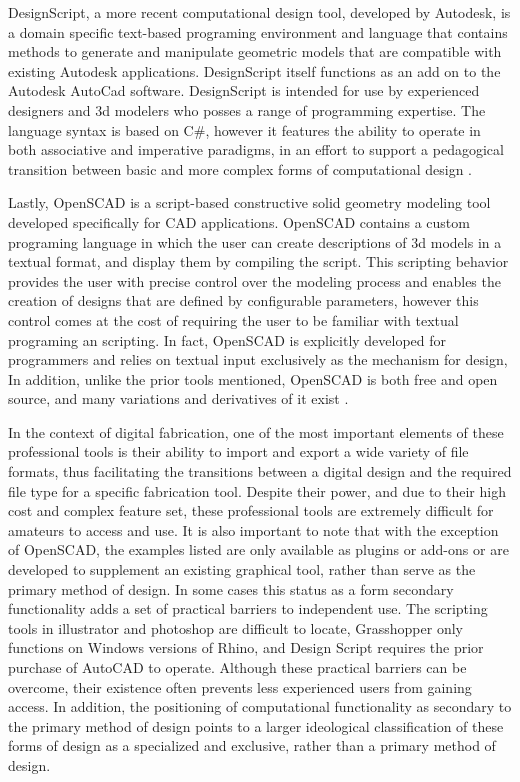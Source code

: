 DesignScript, a more recent computational design tool, developed by Autodesk, is a domain specific text-based programing environment and language that contains methods to generate and manipulate geometric models that are compatible with existing Autodesk applications. DesignScript itself functions as an add on to the Autodesk AutoCad software. DesignScript is intended for use by experienced designers  and 3d modelers who posses a range of programming expertise. The language syntax is based on C\#, however it features the ability to operate in both associative and imperative paradigms, in an effort to support a pedagogical transition between basic and more complex forms of computational design \cite{DesignScript}. 

Lastly, OpenSCAD is a script-based constructive solid geometry modeling tool developed specifically for CAD applications. OpenSCAD contains a custom programing language in which the user can create descriptions of 3d models in a textual format, and display them by compiling the script. This scripting behavior provides the user with precise control over the modeling process and enables the creation of designs that are defined by configurable parameters, however this control comes at the cost of requiring the user to be familiar with textual programing an scripting. In fact, OpenSCAD is explicitly developed for programmers and relies on textual input exclusively as the mechanism for design, In addition, unlike the prior tools mentioned, OpenSCAD is both free and open source, and many variations and derivatives of it exist \cite{OpenScad}.

In the context of digital fabrication, one of the most important elements of these professional tools is their ability to import and export a wide variety of file formats, thus facilitating the transitions between a digital design and the required file type for a specific fabrication tool. Despite their power, and due to their high cost and complex feature set, these professional tools are extremely difficult for amateurs to access and use. It is also important to note that with the exception of OpenSCAD, the examples listed are only available as plugins or add-ons  or are developed to supplement an existing graphical tool, rather than serve as the primary method of design. In some cases this status as a form secondary functionality adds a set of practical barriers to independent use. The scripting tools in illustrator and photoshop are difficult to locate, Grasshopper only functions on Windows versions of Rhino, and Design Script requires the prior purchase of AutoCAD to operate. Although these practical barriers can be overcome, their existence often prevents less experienced users from gaining access. In addition, the positioning of computational functionality as secondary to the primary method of design points to a larger ideological classification of these forms of design as a specialized and exclusive, rather than a primary method of design. 

